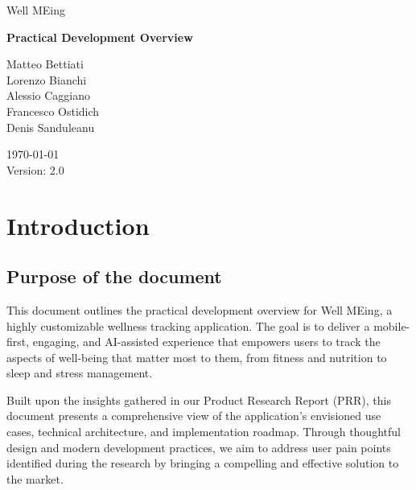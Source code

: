 \documentclass{article}
\begin{document}


\begin{center}

	\fontsize{20pt}{30pt}\selectfont
	Well MEing

	\vspace{2cm}

	\fontsize{25pt}{45pt}\selectfont
	\textbf{Practical Development Overview}

	\vfill

	\fontsize{12pt}{18pt}\selectfont
	Matteo Bettiati \\
	Lorenzo Bianchi \\
	Alessio Caggiano \\
	Francesco Ostidich \\
	Denis Sanduleanu \\

	\vspace{1cm}

	\today \\
	\vspace{12pt}
	Version: 2.0
	\normalsize

\end{center}

\newpage
{}
\tableofcontents
\newpage



\section{Introduction}

\subsection{Purpose of the document}

This document outlines the practical development overview for Well MEing, a highly customizable wellness tracking application.
The goal is to deliver a mobile-first, engaging, and AI-assisted experience that empowers users to track the aspects of well-being that matter most to them, from fitness and nutrition to sleep and stress management.

Built upon the insights gathered in our Product Research Report (PRR), this document presents a comprehensive view of the application's envisioned use cases, technical architecture, and implementation roadmap.
Through thoughtful design and modern development practices, we aim to address user pain points identified during the research by bringing a compelling and effective solution to the market.
\end{document}
